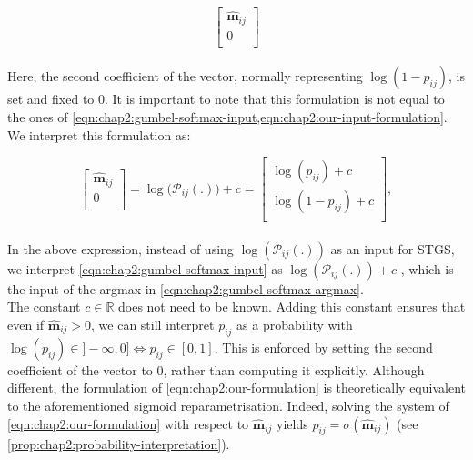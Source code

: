 \begin{equation}
  \label{eqn:chap2:our-input-formulation}
  \begin{bmatrix}
    \bm{\hat{m}}_{ij} \\
    0  \\
  \end{bmatrix}
\end{equation}\\

Here, the second coefficient of the vector, normally representing
$\log(1-p_{ij})$, is set and fixed to 0. It is important to note that this
formulation is not equal to the ones of
\cref{eqn:chap2:gumbel-softmax-input,eqn:chap2:our-input-formulation}. We
interpret this formulation as:

\begin{equation}
  \label{eqn:chap2:our-formulation}
  \begin{bmatrix}
    \bm{\hat{m}}_{ij} \\
    0  \\
  \end{bmatrix}
  = \log\big(\mathcal{P}_{ij}(.)\big) + c =
  \begin{bmatrix}
    \log(p_{ij}) + c \\
    \log(1-p_{ij}) + c\\
  \end{bmatrix},
\end{equation}\\

\noindent In the above expression, instead of using $\log(\mathcal{P}_{ij}(.))$
as an input for \ac{STGS}, we interpret \cref{eqn:chap2:gumbel-softmax-input} as
$\log(\mathcal{P}_{ij}(.)) + c$ , which is the input of the argmax in
\cref{eqn:chap2:gumbel-softmax-argmax}.\\

The constant $c \in \mathds{R}$ does not need to be known.
Adding this constant ensures that even if $\bm{\hat{m}}_{ij} > 0$, we can still interpret $p_{ij}$
as a probability with $\log(p_{ij}) \in ]-\infty,0] \Leftrightarrow p_{ij} \in [0,1]$. This is
enforced by setting the second coefficient of the vector to 0, rather
than computing it explicitly. Although different, the formulation of
\cref{eqn:chap2:our-formulation} is theoretically equivalent to the
aforementioned sigmoid reparametrisation. Indeed, solving the system of
\cref{eqn:chap2:our-formulation} with respect to $\bm{\hat{m}}_{ij}$ yields $p_{ij} =
\sigma(\bm{\hat{m}}_{ij})$ (see \cref{prop:chap2:probability-interpretation}). \\


